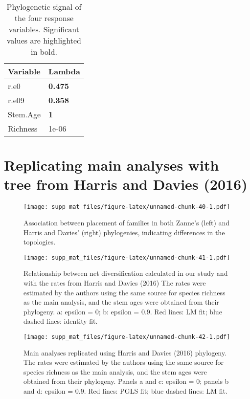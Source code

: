\documentclass[]{article}
\begin{document}
\begin{table}[H]

\caption{\label{tab:unnamed-chunk-38}Phylogenetic signal of the four response variables. Significant values are highlighted in bold.}
\centering
\begin{tabular}{l|l}
\hline
Variable & Lambda\\
\hline
r.e0 & \textbf{0.475}\\
\hline
r.e09 & \textbf{0.358}\\
\hline
Stem.Age & \textbf{1}\\
\hline
Richness & 1e-06\\
\hline
\end{tabular}
\end{table}

\hypertarget{replicating-main-analyses-with-tree-from-harris-and-davies-2016}{%
\section{Replicating main analyses with tree from Harris and Davies
(2016)}\label{replicating-main-analyses-with-tree-from-harris-and-davies-2016}}

\begin{figure}
\centering
\texttt{[image: supp\_mat\_files/figure-latex/unnamed-chunk-40-1.pdf]}
\caption{Association between placement of families in both Zanne's
(left) and Harris and Davies' (right) phylogenies, indicating
differences in the topologies.}
\end{figure}

\begin{figure}
\centering
\texttt{[image: supp\_mat\_files/figure-latex/unnamed-chunk-41-1.pdf]}
\caption{Relationship between net diversification calculated in our
study and with the rates from Harris and Davies (2016) The rates were
estimated by the authors using the same source for species richness as
the main analysis, and the stem ages were obtained from their phylogeny.
a: epsilon = 0; b: epsilon = 0.9. Red lines: LM fit; blue dashed lines:
identity fit.}
\end{figure}

\begin{figure}
\centering
\texttt{[image: supp\_mat\_files/figure-latex/unnamed-chunk-42-1.pdf]}
\caption{Main analyses replicated using Harris and Davies (2016)
phylogeny. The rates were estimated by the authors using the same source
for species richness as the main analysis, and the stem ages were
obtained from their phylogeny. Panels a and c: epsilon = 0; panels b and
d: epsilon = 0.9. Red lines: PGLS fit; blue dashed lines: LM fit.}
\end{figure}
\end{document}
